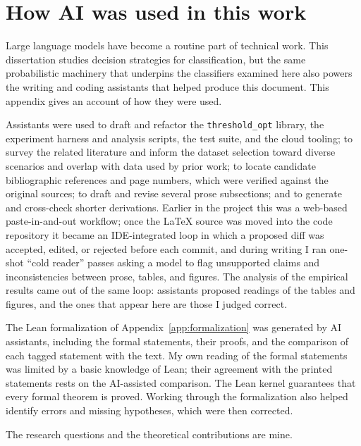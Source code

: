 \chapter{How AI was used in this work}\label{app:ai-disclosure}

Large language models have become a routine part of technical work. This dissertation studies decision strategies for classification, but the same probabilistic machinery that underpins the classifiers examined here also powers the writing and coding assistants that helped produce this document. This appendix gives an account of how they were used.

Assistants were used to draft and refactor the \texttt{threshold\_opt} library, the experiment harness and analysis scripts, the test suite, and the cloud tooling; to survey the related literature and inform the dataset selection toward diverse scenarios and overlap with data used by prior work; to locate candidate bibliographic references and page numbers, which were verified against the original sources; to draft and revise several prose subsections; and to generate and cross-check shorter derivations. Earlier in the project this was a web-based paste-in-and-out workflow; once the \LaTeX{} source was moved into the code repository it became an IDE-integrated loop in which a proposed diff was accepted, edited, or rejected before each commit, and during writing I ran one-shot ``cold reader'' passes asking a model to flag unsupported claims and inconsistencies between prose, tables, and figures. The analysis of the empirical results came out of the same loop: assistants proposed readings of the tables and figures, and the ones that appear here are those I judged correct.

The Lean formalization of Appendix~\ref{app:formalization} was generated by AI assistants, including the formal statements, their proofs, and the comparison of each tagged statement with the text. My own reading of the formal statements was limited by a basic knowledge of Lean; their agreement with the printed statements rests on the AI-assisted comparison. The Lean kernel guarantees that every formal theorem is proved. Working through the formalization also helped identify errors and missing hypotheses, which were then corrected.

The research questions and the theoretical contributions are mine.
